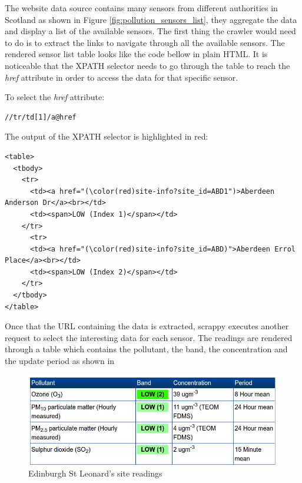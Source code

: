 The website data source contains many sensors from different authorities in Scotland as shown in Figure \ref{fig:pollution_sensors_list}, they aggregate the data and display a list of the available sensors. The first thing the crawler would need to do is to extract the links to navigate through all the available sensors. The rendered sensor list table looks like the code bellow in plain HTML. It is noticeable that the XPATH selector needs to go through the table to reach the \textit{href} attribute in order to access the data for that specific sensor. 

To select the \textit{href} attribute: 

{\centering
\begin{BVerbatim}
//tr/td[1]/a@href
\end{BVerbatim}
\par
}

The output of the XPATH selector is highlighted in red: 

\begin{Verbatim}[fontsize=\small,commandchars=\\\(\)]
<table>
  <tbody>
    <tr>
      <td><a href="(\color(red)site-info?site_id=ABD1")>Aberdeen Anderson Dr</a><br></td>
      <td><span>LOW (Index 1)</span></td>
    </tr>
      <tr>
      <td><a href="(\color(red)site-info?site_id=ABD)">Aberdeen Errol Place</a><br></td>
      <td><span>LOW (Index 2)</span></td>
    </tr>
  </tbody>
</table>
\end{Verbatim}

Once that the URL containing the data is extracted, scrappy executes another request to select the interesting data for each sensor. The readings are rendered through a table which contains the pollutant, the band, the concentration and the update period as shown in 

\begin{figure}[H]
\begin{adjustbox}{width=.5\textwidth,center=\textwidth}
  \centering
  \includegraphics[scale=1]{images/site_readings.png}
\end{adjustbox}
  \caption[Edinburgh St Leonard's site readings]{Edinburgh St Leonard's site readings \footnotemark}
  \label{fig:pollution_site readings}
\end{figure}



